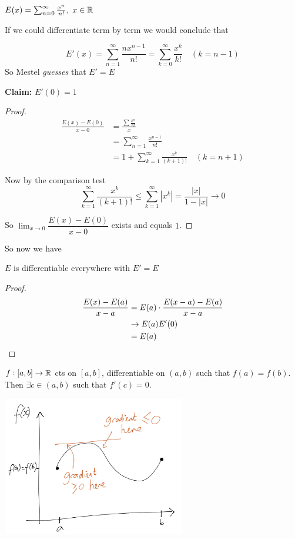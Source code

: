 \documentclass[10pt,twoside]{scrartcl}
\begin{document}
\begin{example}
$E(x) = \sum_{n=0}^\infty \frac{x^n}{n!},~x\in\mathbb{R}$	

If we could differentiate term by term we would conclude that

\[E'(x) = \sum_{n=1}^\infty \frac{nx^{n-1}}{n!} = \sum_{k=0}^\infty \frac{x^k}{k!} \quad(k=n-1)\]
So Mestel \emph{guesses} that $E' = E$

\textbf{Claim:} $E'(0) = 1$
\begin{proof}
\begin{align*}\frac{E(x) -E(0)}{x-0} &= \frac{\sum \frac{x^n}{n!}}{x}\\
&= \sum_{n=1}^\infty \frac{x^{n-1}}{n!}\\
&= 1 + \sum_{k=1}^\infty \frac{x^k}{(k+1)!} \quad(k = n+1)
\end{align*}


Now by the comparison test \[\sum_{k=1}^\infty \frac{x^k}{(k+1)!} \leq \sum_{k=1}^\infty |x^k| = \dfrac{|x|}{1-|x|} \to 0\]

So $\lim_{x\to 0} \dfrac{E(x) - E(0)}{x-0}$ exists and equals $1$. 
\end{proof}

So now we have
\begin{proposition}
$E$ is differentiable everywhere with $E' = E$	
\end{proposition}
\begin{proof}

\begin{align*}
\frac{E(x) - E(a)}{x-a} &= E(a)\cdot \frac{E(x-a)-E(a)}{x-a}\\
 &\to E(a)E'(0) \\
&= E(a)	\qedhere
\end{align*}
\end{proof}
\end{example}\vspace*{15pt}


\vspace*{10pt}


\begin{theorem}
	$f:[a,b] \to \mathbb{R}$ cts on $[a,b]$, differentiable on $(a,b)$ such that $f(a) = f(b)$. Then $\exists c \in (a,b)$ such that $f'(c) = 0$.
\end{theorem}



\begin{center}
\includegraphics[width = 8cm]{rolle.jpg}
\end{center}
\end{document}
